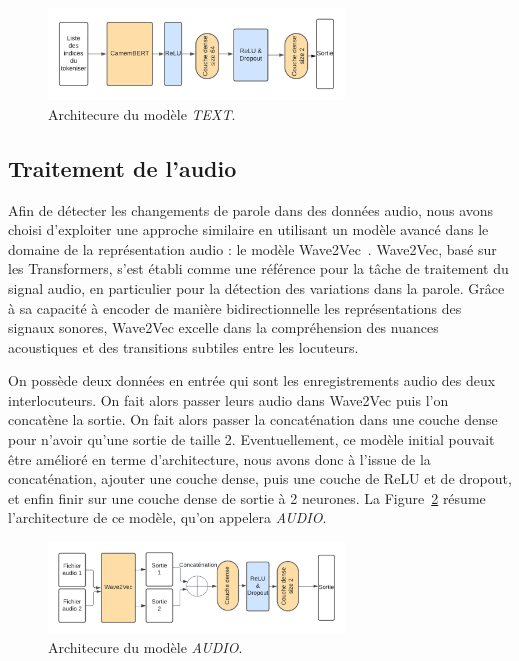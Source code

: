 \begin{figure}[H]
    \centering
    \includegraphics[width=0.7\textwidth]{image_model/model_text.png}
    \caption{Architecure du modèle \textit{TEXT}.}
    \label{fig: model_text}
\end{figure}

\subsection{Traitement de l'audio}

Afin de détecter les changements de parole dans des données audio, nous avons choisi d'exploiter une approche similaire en utilisant
un modèle avancé dans le domaine de la représentation audio : le modèle Wave2Vec~\cite{wav2vec}. Wave2Vec, basé sur les Transformers, s'est établi
comme une référence pour la tâche de traitement du signal audio, en particulier pour la détection des variations dans la parole.
Grâce à sa capacité à encoder de manière bidirectionnelle les représentations des signaux sonores, Wave2Vec excelle dans la
compréhension des nuances acoustiques et des transitions subtiles entre les locuteurs. 

On possède deux données en entrée qui sont les enregistrements audio des deux interlocuteurs. On fait alors passer leurs audio dans
Wave2Vec puis l'on concatène la sortie. On fait alors passer la concaténation dans une couche dense pour n'avoir qu'une sortie de
taille 2.
Eventuellement, ce modèle initial pouvait être amélioré en terme d'architecture, nous avons donc à l'issue de la concaténation,
ajouter une couche dense, puis une couche de ReLU et de dropout, et enfin finir sur une couche dense de sortie à 2 neurones. 
La Figure~\ref{fig: model_audio} résume l'architecture de ce modèle, qu'on appelera \textit{AUDIO}.

\begin{figure}[H]
    \centering
    \includegraphics[width=0.7\textwidth]{image_model/model_audio.png}
    \caption{Architecure du modèle \textit{AUDIO}.}
    \label{fig: model_audio}
\end{figure}

